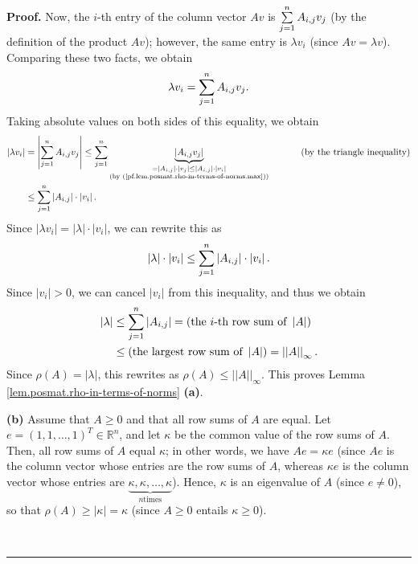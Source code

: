 \documentclass[numbers=enddot,12pt,final,onecolumn,notitlepage]{scrartcl}%
\numberwithin{exer}{subsection}
\theoremstyle{definition}
\newenvironment{proof}[1][Proof]{\noindent\textbf{#1.} }{\ \rule{0.5em}{0.5em}}
\let\sumnonlimits\sum
\renewcommand{\sum}{\sumnonlimits\limits}
\begin{document}
\begin{proof}
Now, the $i$-th entry of the column vector $Av$ is $\sum\limits_{j=1}%
^{n}A_{i,j}v_{j}$ (by the definition of the product $Av$); however, the same
entry is $\lambda v_{i}$ (since $Av=\lambda v$). Comparing these two facts, we
obtain%
\[
\lambda v_{i}=\sum\limits_{j=1}^{n}A_{i,j}v_{j}.
\]
Taking absolute values on both sides of this equality, we obtain%
\begin{align*}
\left\vert \lambda v_{i}\right\vert  &  =\left\vert \sum\limits_{j=1}%
^{n}A_{i,j}v_{j}\right\vert \leq\sum\limits_{j=1}^{n}\underbrace{\left\vert
A_{i,j}v_{j}\right\vert }_{\substack{=\left\vert A_{i,j}\right\vert
\cdot\left\vert v_{j}\right\vert \leq\left\vert A_{i,j}\right\vert
\cdot\left\vert v_{i}\right\vert \\\text{(by
(\ref{pf.lem.posmat.rho-in-terms-of-norms.max}))}}}\ \ \ \ \ \ \ \ \ \ \left(
\text{by the triangle inequality}\right) \\
&  \leq\sum\limits_{j=1}^{n}\left\vert A_{i,j}\right\vert \cdot\left\vert
v_{i}\right\vert .
\end{align*}
Since $\left\vert \lambda v_{i}\right\vert =\left\vert \lambda\right\vert
\cdot\left\vert v_{i}\right\vert $, we can rewrite this as
\[
\left\vert \lambda\right\vert \cdot\left\vert v_{i}\right\vert \leq
\sum\limits_{j=1}^{n}\left\vert A_{i,j}\right\vert \cdot\left\vert
v_{i}\right\vert .
\]
Since $\left\vert v_{i}\right\vert >0$, we can cancel $\left\vert
v_{i}\right\vert $ from this inequality, and thus we obtain%
\begin{align*}
\left\vert \lambda\right\vert  &  \leq\sum\limits_{j=1}^{n}\left\vert
A_{i,j}\right\vert =\left(  \text{the }i\text{-th row sum of }\left\vert
A\right\vert \right) \\
&  \leq\left(  \text{the largest row sum of }\left\vert A\right\vert \right)
=\left\vert \left\vert A\right\vert \right\vert _{\infty}.
\end{align*}
Since $\rho\left(  A\right)  =\left\vert \lambda\right\vert $, this rewrites
as $\rho\left(  A\right)  \leq\left\vert \left\vert A\right\vert \right\vert
_{\infty}$. This proves Lemma \ref{lem.posmat.rho-in-terms-of-norms}
\textbf{(a)}. \medskip

\textbf{(b)} Assume that $A\geq0$ and that all row sums of $A$ are equal. Let
$e=\left(  1,1,\ldots,1\right)  ^{T}\in\mathbb{R}^{n}$, and let $\kappa$ be
the common value of the row sums of $A$. Then, all row sums of $A$ equal
$\kappa$; in other words, we have $Ae=\kappa e$ (since $Ae$ is the column
vector whose entries are the row sums of $A$, whereas $\kappa e$ is the column
vector whose entries are $\underbrace{\kappa,\kappa,\ldots,\kappa}_{n\text{
times}}$). Hence, $\kappa$ is an eigenvalue of $A$ (since $e\neq0$), so that
$\rho\left(  A\right)  \geq\left\vert \kappa\right\vert =\kappa$ (since
$A\geq0$ entails $\kappa\geq0$).


\end{proof}
\end{document}
